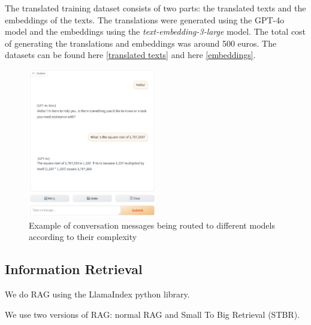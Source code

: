 \documentclass[a4paper,12pt,twoside]{ThesisStyle}
\begin{document}
The translated training dataset consists of two parts: the translated texts and the embeddings of the texts. The translations were generated using the GPT-4o model and the embeddings using the \textit{text-embedding-3-large} model. The total cost of generating the translations and embeddings was around 500 euros. The datasets can be found here \href{https://huggingface.co/datasets/SupremeLobster/gpt4_judge_battles_catalan}{[translated texts]} and here \href{https://huggingface.co/datasets/SupremeLobster/gpt4_judge_battles_catalan_embeddings}{[embeddings]}.

\begin{figure}[H]
  \centering
  \includegraphics[width=0.5\textwidth]{img/Routed conversation.png}
  \caption{Example of conversation messages being routed to different models according to their complexity}
  \label{fig:model_routing_example}
\end{figure}

\subsection{Information Retrieval}
\label{subsec:information_retrieval}

We do RAG using the LlamaIndex python library.

We use two versions of RAG: normal RAG and Small To Big Retrieval (STBR).
\end{document}
